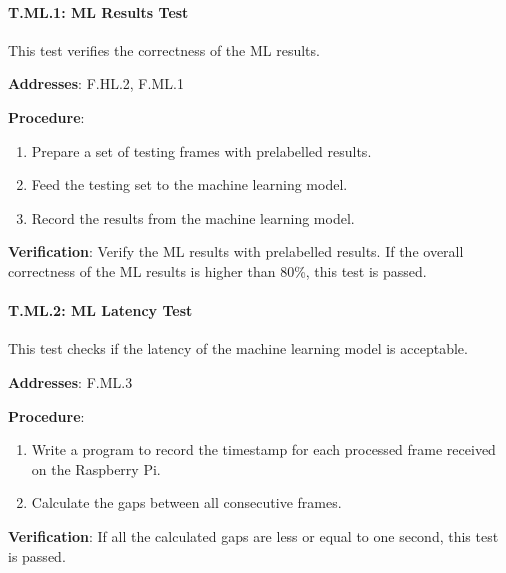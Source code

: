 \paragraph{T.ML.1: ML Results Test}

This test verifies the correctness of the ML results.

\textbf{Addresses}: F.HL.2, F.ML.1

\textbf{Procedure}:
\begin{enumerate}[noitemsep]
    \item Prepare a set of testing frames with prelabelled results.
    \item Feed the testing set to the machine learning model.
    \item Record the results from the machine learning model.
\end{enumerate}

\textbf{Verification}: 
Verify the ML results with prelabelled results. If the overall correctness of the ML results is higher than 80\%, this test is passed.

%

\paragraph{T.ML.2: ML Latency Test}

This test checks if the latency of the machine learning model is acceptable.

\textbf{Addresses}: F.ML.3

\textbf{Procedure}:
\begin{enumerate}[noitemsep]
    \item Write a program to record the timestamp for each processed frame received on the Raspberry Pi.
    \item Calculate the gaps between all consecutive frames.
\end{enumerate}

\textbf{Verification}: 
If all the calculated gaps are less or equal to one second, this test is passed.